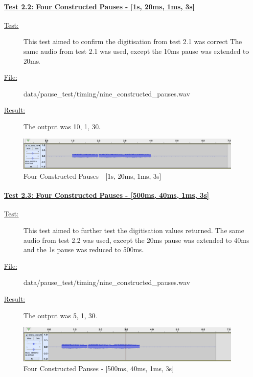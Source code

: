 \paragraph{\underline{Test 2.2: Four Constructed Pauses - [1s, 20ms, 1ms, 3s]}}
\begin{description}
	\item[\underline{Test:}] This test aimed to confirm the digitisation from test 2.1 was correct 
						The same audio from test 2.1 was used, except the 10ms pause was extended to 20ms.
	\item[\underline{File:}] data/pause\_test/timing/nine\_constructed\_pauses.wav
	\item[\underline{Result:}] The output was 10, 1, 30.
\end{description}
\begin{figure}[h]
	\center
	\includegraphics[scale=0.3]{src/main-matter/results/preliminary-testing/detection/1s_20ms_1ms_3s}
	\caption{Four Constructed Pauses - [1s, 20ms, 1ms, 3s]}
	\label{fig:022}
\end{figure}


\paragraph{\underline{Test 2.3: Four Constructed Pauses - [500ms, 40ms, 1ms, 3s]}}
\begin{description}
	\item[\underline{Test:}] This test aimed to further test the digitisation values returned.
						The same audio from test 2.2 was used, except the 20ms pause was extended to 40ms
						and the 1s pause was reduced to 500ms.
	\item[\underline{File:}] data/pause\_test/timing/nine\_constructed\_pauses.wav
	\item[\underline{Result:}] The output was 5, 1, 30.
\end{description}
\begin{figure}[h]
	\center
	\includegraphics[scale=0.3]{src/main-matter/results/preliminary-testing/detection/500ms_40ms_1ms_3s}
	\caption{Four Constructed Pauses - [500ms, 40ms, 1ms, 3s]}
	\label{fig:023}
\end{figure}


